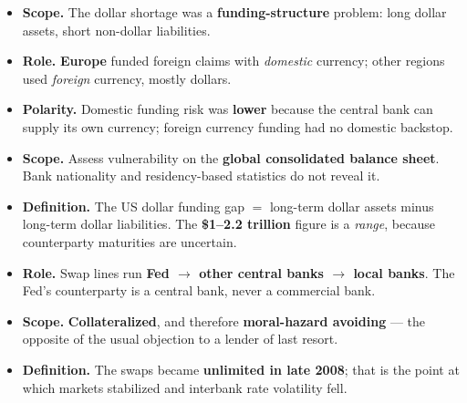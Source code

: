 \begin{lrtrapbox}
\begin{itemize}
\item \textbf{Scope.} The dollar shortage was a \textbf{funding-structure} problem: long dollar assets, short non-dollar liabilities.
\item \textbf{Role.} \textbf{Europe} funded foreign claims with \emph{domestic} currency; other regions used \emph{foreign} currency, mostly dollars.
\item \textbf{Polarity.} Domestic funding risk was \textbf{lower} because the central bank can supply its own currency; foreign currency funding had no domestic backstop.
\item \textbf{Scope.} Assess vulnerability on the \textbf{global consolidated balance sheet}. Bank nationality and residency-based statistics do not reveal it.
\item \textbf{Definition.} The US dollar funding gap $=$ long-term dollar assets minus long-term dollar liabilities. The \textbf{\$1--2.2 trillion} figure is a \emph{range}, because counterparty maturities are uncertain.
\item \textbf{Role.} Swap lines run \textbf{Fed $\rightarrow$ other central banks $\rightarrow$ local banks}. The Fed's counterparty is a central bank, never a commercial bank.
\item \textbf{Scope.} \textbf{Collateralized}, and therefore \textbf{moral-hazard avoiding} --- the opposite of the usual objection to a lender of last resort.
\item \textbf{Definition.} The swaps became \textbf{unlimited in late 2008}; that is the point at which markets stabilized and interbank rate volatility fell.
\end{itemize}
\end{lrtrapbox}
